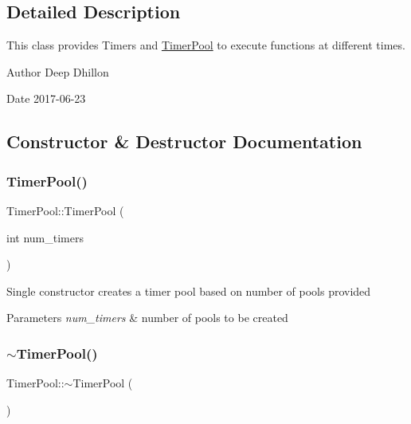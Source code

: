 \subsection{Detailed Description}
This class provides Timers and \hyperlink{class_timer_pool}{Timer\+Pool} to execute functions at different times. 

\begin{DoxyAuthor}{Author}
Deep Dhillon 
\end{DoxyAuthor}
\begin{DoxyDate}{Date}
2017-\/06-\/23 
\end{DoxyDate}


\subsection{Constructor \& Destructor Documentation}
\mbox{\label{class_timer_pool_a64f48532ae5d7e0e314c3f72b9ebfffe}} 
\subsubsection{\texorpdfstring{Timer\+Pool()}{TimerPool()}}
{\footnotesize\ttfamily Timer\+Pool\+::\+Timer\+Pool (\begin{DoxyParamCaption}\item[{int}]{num\+\_\+timers }\end{DoxyParamCaption})}

Single constructor creates a timer pool based on number of pools provided 
\begin{DoxyParams}{Parameters}
{\em num\+\_\+timers} & number of pools to be created \\
\hline
\end{DoxyParams}
\mbox{\label{class_timer_pool_a2ae48caaa6ba965b6c59e5e9d13b8276}} 
\subsubsection{\texorpdfstring{$\sim$\+Timer\+Pool()}{~TimerPool()}}
{\footnotesize\ttfamily Timer\+Pool\+::$\sim$\+Timer\+Pool (\begin{DoxyParamCaption}{ }\end{DoxyParamCaption})}

